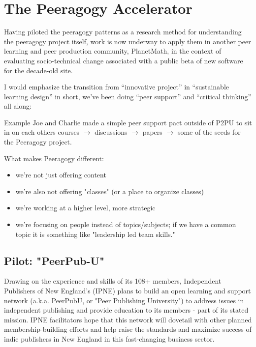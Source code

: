 \documentclass{acm_proc_article-sp}
\begin{document}
\section{The Peeragogy Accelerator}

Having piloted the peeragogy patterns as a research method for
understanding the peeragogy project itself, work is now underway to
apply them in another peer learning and peer production community,
PlanetMath, in the context of evaluating socio-technical change
associated with a public beta of new software for the decade-old site.

I would emphasize the transition from ``innovative project'' in
``sustainable learning design'' in short, we've been doing ``peer
support'' and ``critical thinking'' all along:

\begin{paragraph}{Example}
Joe and Charlie made a simple peer support pact outside of P2PU to sit
in on each others courses $\rightarrow$ discussions $\rightarrow$
papers $\rightarrow$ some of the seeds for the Peeragogy project.
\end{paragraph}

What makes Peeragogy different:
\begin{itemize}
\item we're not just offering content
\item we're also not offering "classes" (or a place to organize classes)
\item we're working at a higher level, more strategic
\item we're focusing on people instead of topics/subjects; if we have
  a common topic it is something like "leadership led team skills."
\end{itemize}

\subsection{Pilot: "PeerPub-U"}

Drawing on the experience and skills of its 108+ members, Independent
Publishers of New England's (IPNE) plans to build an open learning and support network (a.k.a. PeerPubU, or "Peer Publishing University") to address issues in independent publishing and provide education to its members - part of its stated mission. IPNE facilitators hope that this network will dovetail with other planned membership-building efforts and help raise the standards and maximize success of indie publishers in New England in this fast-changing business sector.
\end{document}
